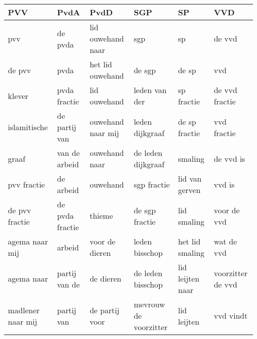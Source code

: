 \begin{tabular}{llllll}
\toprule
               PVV &             PvdA &               PvdD &                    SGP &                SP &                VVD \\
\midrule
               pvv &          de pvda &  lid ouwehand naar &                    sgp &                sp &             de vvd \\
            de pvv &             pvda &   het lid ouwehand &                 de sgp &             de sp &                vvd \\
            klever &     pvda fractie &       lid ouwehand &          leden van der &        sp fractie &     de vvd fractie \\
      islamitische &    de partij van &  ouwehand naar mij &        leden dijkgraaf &     de sp fractie &        vvd fractie \\
             graaf &    van de arbeid &      ouwehand naar &     de leden dijkgraaf &           smaling &          de vvd is \\
       pvv fractie &        de arbeid &           ouwehand &            sgp fractie &    lid van gerven &             vvd is \\
    de pvv fractie &  de pvda fractie &             thieme &         de sgp fractie &       lid smaling &        voor de vvd \\
    agema naar mij &           arbeid &     voor de dieren &         leden bisschop &   het lid smaling &         wat de vvd \\
        agema naar &    partij van de &          de dieren &      de leden bisschop &  lid leijten naar &  voorzitter de vvd \\
 madlener naar mij &       partij van &     de partij voor &  mevrouw de voorzitter &       lid leijten &          vvd vindt \\
\bottomrule
\end{tabular}
